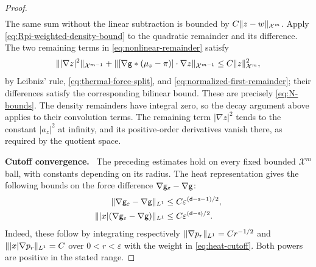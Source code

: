 \documentclass[11pt,reqno]{amsart}
\numberwithin{equation}{section}
\theoremstyle{plain}
\theoremstyle{remark}
\DeclarePairedDelimiter{\norm}{\lVert}{\rVert}
\renewcommand{\d}{\mathsf{d}}\newcommand{\s}{\mathsf{s}}
\newcommand{\parheading}[1]{\par\medskip\noindent\textbf{#1}\ }
\newcommand{\Xspace}{\mathcal X}
\begin{document}
\begin{proof}
\begin{align}
\end{align}
The same sum without the linear subtraction is bounded by $C\norm{z-w}_{\Xspace^m}$. Apply \eqref{eq:Rpi-weighted-density-bound} to the quadratic remainder and its difference. The two remaining terms in \eqref{eq:nonlinear-remainder} satisfy
\begin{equation}\label{eq:nonlinear-local-products}
 \norm{|\nabla z|^2}_{\Xspace^{m-1}}
 +\norm{[\nabla\g*(\mu_z-\pi)]\cdot\nabla z}_{\Xspace^{m-1}}
 \le C\norm z_{\Xspace^m}^2,
\end{equation}
by Leibniz' rule, \eqref{eq:thermal-force-split}, and \eqref{eq:normalized-first-remainder}; their differences satisfy the corresponding bilinear bound. These are precisely \eqref{eq:N-bounds}. The density remainders have integral zero, so the decay argument above applies to their convolution terms. The remaining term $|\nabla z|^2$ tends to the constant $|a_z|^2$ at infinity, and its positive-order derivatives vanish there, as required by the quotient space.

\parheading{Cutoff convergence.}
The preceding estimates hold on every fixed bounded $\Xspace^m$ ball, with constants depending on its radius. The heat representation gives the following bounds on the force difference $\nabla\mathsf g_\varepsilon-\nabla\mathsf g$:
\begin{align}
 \norm{\nabla\g_\varepsilon-\nabla\g}_{L^1}
 &\le C\varepsilon^{(\d-\s-1)/2},\label{eq:logmaps-cutoff-force-L1}\\
 \norm{|x|(\nabla\g_\varepsilon-\nabla\g)}_{L^1}
 &\le C\varepsilon^{(\d-\s)/2}.\label{eq:logmaps-cutoff-force-weighted}
\end{align}
Indeed, these follow by integrating respectively $\norm{\nabla p_r}_{L^1}=C r^{-1/2}$ and $\norm{|x|\nabla p_r}_{L^1}=C$ over $0<r<\varepsilon$ with the weight in \eqref{eq:heat-cutoff}. Both powers are positive in the stated range.


\end{proof}
\end{document}
